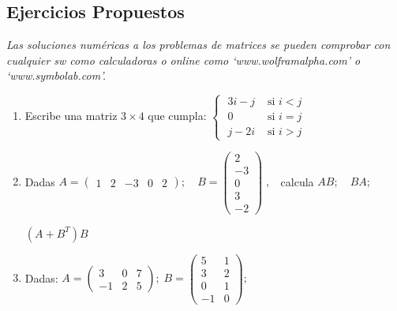 	


\subsection {Ejercicios Propuestos}

\textcolor{gris}{\emph{Las soluciones numéricas a los problemas de matrices se pueden comprobar con cualquier sw como calculadoras o online como `www.wolframalpha.com' o `www.symbolab.com'.}}

\begin{enumerate}

\item Escribe una matriz $3\times 4$ que cumpla: $\begin{cases} \; 3i-j & \text{ si } i<j \\
\; 0 & \text{ si } i=j \\ \; j-2i & \text{ si } i>j	
\end{cases}$


\item Dadas $A=\left( \begin{matrix} 1&2&-3&0&2  \end{matrix} \right); \quad
 B=\left( \begin{matrix} 2\\-3\\0\\3\\-2  \end{matrix} \right)\;,\; \;  $ calcula $AB; \quad BA;$
 
\noindent $(A+B^T)B$  
 
\rightline{\textcolor{gris}{Solución: usa un sw. adecuado para comprobar tus resultados.}}

\item \normalsize{Dadas:} $A=\left( \begin{array}{ccc} 3&0&7\\-1&2&5\end{array}\right); \;
B=\left( \begin{array}{cc} 5&1\\3&2\\0&1\\-1&0 \end{array}\right); \;$


\end{enumerate}
